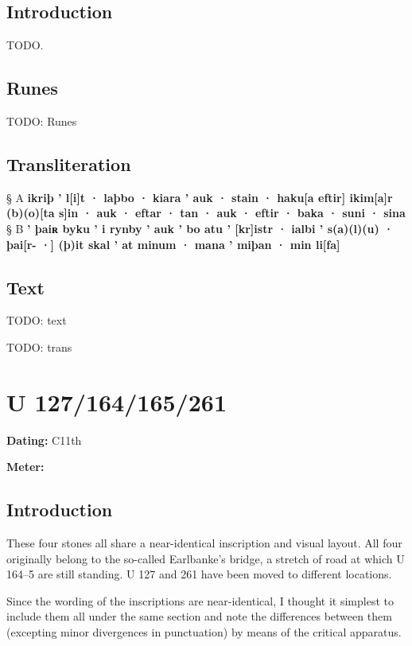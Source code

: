 \subsection{Introduction}

TODO.

\subsection{Runes}

TODO: Runes%

\subsection{Transliteration}

§ A \textbf{ikriþ ’ l[i]t · laþbo · kiara ’ auk · stain · haku[a eftir] ikim[a]r (b)(o)[ta s]in · auk · eftar · tan · auk · eftir · baka · suni · sina} \\
§ B \textbf{’ þaiʀ byku ’ i rynby ’ auk ’ bo atu ’ [kr]istr · ialbi ’ s(a)(l)(u) · þai[r- ·] (þ)it skal ’ at minum · mana ’ miþan · min li[fa]}

\subsection{Text}

\bpg\bpa[0]%
TODO: text\epa

\bpb TODO: trans\epb\epg

\sectionline\clearpage


\section{U 127/164/165/261}

\begin{flushright}%
\textbf{Dating:} C11th

\textbf{Meter:} \Fornyrdislag
\end{flushright}%

\subsection{Introduction}

These four stones all share a near-identical inscription and visual layout.  All four originally belong to the so-called Earlbanke’s bridge, a stretch of road at which U 164--5 are still standing.  U 127 and 261 have been moved to different locations.

Since the wording of the inscriptions are near-identical, I thought it simplest to include them all under the same section and note the differences between them (excepting minor divergences in punctuation) by means of the critical apparatus.

